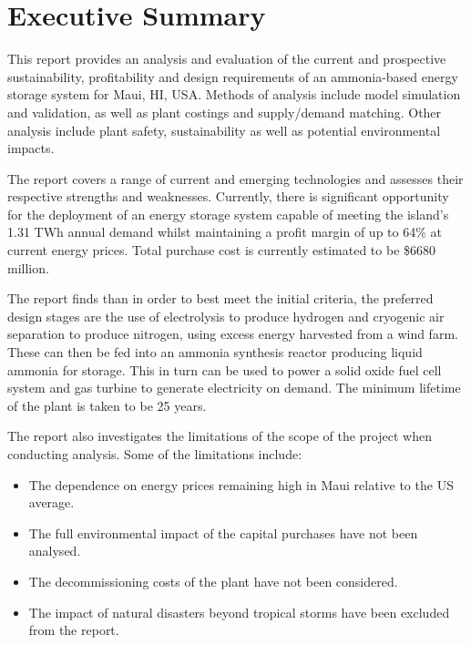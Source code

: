 






%

\section{Executive Summary}

This report provides an analysis and evaluation of the current and prospective  sustainability, profitability and design requirements of an ammonia-based energy storage system for Maui, HI, USA. Methods of analysis include model simulation and validation, as well as plant costings and supply/demand matching. Other analysis include plant safety, sustainability as well as potential environmental impacts.

The report covers a range of current and emerging technologies and assesses their respective strengths and weaknesses. Currently, there is significant opportunity for the deployment of an energy storage system capable of meeting the island's 1.31 TWh annual demand whilst maintaining a profit margin of up to 64\% at current energy prices. Total purchase cost is currently estimated to be \$6680 million.


The report finds than in order to best meet the initial criteria, the preferred design stages are the use of electrolysis to produce hydrogen and cryogenic air separation to produce nitrogen, using excess energy harvested from a wind farm. These can then be fed into an ammonia synthesis reactor producing liquid ammonia for storage. This in turn can be used to power a solid oxide fuel cell system and gas turbine to generate electricity on demand. The minimum lifetime of the plant is taken to be 25 years.

The report also investigates the limitations of the scope of the project when conducting analysis. Some of the limitations include:
\begin{itemize}
    \item The dependence on energy prices remaining high in Maui relative to the US average.
    \item The full environmental impact of the capital purchases have not been analysed.
    \item The decommissioning costs of the plant have not been considered.
    \item The impact of natural disasters beyond tropical storms have been excluded from the report.

\end{itemize}



%
%
%